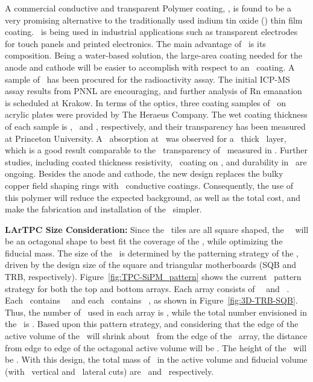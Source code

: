 A commercial conductive and transparent Polymer coating, \Clevios, is found to be a very promising alternative to the traditionally used indium tin oxide (\ITO) thin film coating. \Clevios\ is being used in industrial applications such as transparent electrodes for touch panels and printed electronics. The main advantage of \Clevios\ is its composition.  Being a water-based solution, the large-area coating needed for the anode and cathode will be easier to accomplish with respect to an \ITO\ coating.  A sample of \CleviosFirstTestSampleMass\ has been procured for the radioactivity assay. The initial ICP-MS assay results from PNNL are encouraging, and further analysis of Rn emanation is scheduled at Krakow. In terms of the optics, three coating samples of \Clevios\ on acrylic plates were provided by The Heraeus Company. The wet coating thickness of each sample is \CleviosSampleThicknessFour, \CleviosSampleThicknessEight\ and \CleviosSampleThicknessTwelve, respectively, and their transparency has been measured at Princeton University. A \CleviosTestAbsorptionFour\ absorption at \DSfPMTWaveLength\ was observed for a \CleviosSampleThicknessFour\ thick \Clevios\ layer, which is a good result comparable to the \DSkITOTransparency\ transparency of \ITO\ measured in \DSfs. Further studies, including coated thickness resistivity, \TPB\ coating on \Clevios, and durability in \LAr\ are ongoing. Besides the anode and cathode, the new design replaces the bulky copper field shaping rings with \Clevios\ conductive coatings. Consequently, the use of this polymer will reduce the expected background, as well as the total cost, and make the fabrication and installation of the \TPC\ simpler. 

{\bf LArTPC Size Consideration:} Since the \SiPM\ tiles are all square shaped, the \DSks\ \TPC\ will be an octagonal shape to best fit the coverage of the \DSkPdm, while optimizing the fiducial mass.  The size of the \TPC\ is determined by the patterning strategy of the \SiPMs, driven by the design size of the square and triangular motherboards (SQB and TRB, respectively).  Figure~\ref{fig:TPC-SiPM_pattern} shows the current \SiPM\ pattern strategy for both the top and bottom arrays. Each array consists of \DSkArraySQBNumber\ \SQBs\ and \DSkArrayTRBNumber\ \TRBs. Each \TRB\ contains \DSkTRBPdmsNumber\ \DSkPdms\ and each \SQB\ contains \DSkSQBPdmsNumber\ \DSkPdms, as shown in Figure~\ref{fig:3D-TRB-SQB}. Thus, the number of \DSkPdms\ used in each array is \DSkTilesHalfNumber, while the total number envisioned in the \TPC\ is \DSkTilesNumber.  Based upon this pattern strategy, and considering that the edge of the active volume of the \TPC\ will shrink about \DSkEdgeActiveVolumeShrinkage\ from the edge of the \SiPM\ array, the distance from edge to edge of the octagonal active volume will be \DSkActiveDiameter.  The height of the \TPC\ will be \DSkTPCHeight. With this design, the total mass of \LAr\ in the active volume and fiducial volume (with \DSkVetoFVTPCcutz\ vertical and \DSkVetoFVTPCcut\ lateral cuts) are \DSkActiveMass\ and \DSkFiducialMass\ respectively. 

